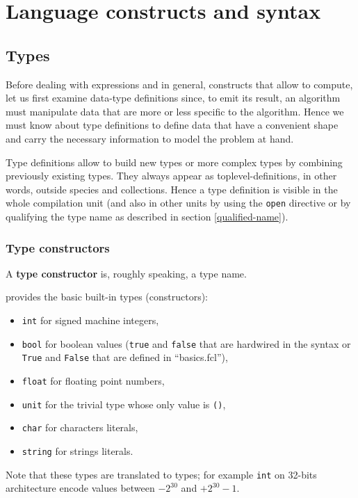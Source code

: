 

\section{Language constructs and syntax}
\subsection{Types}
Before dealing with expressions and in general, constructs that allow to
compute, let us first examine data-type definitions since, to emit its
result, an algorithm must manipulate data that are more or less specific to
the algorithm. Hence we must know about type definitions to define data that
have a convenient shape and carry the necessary information to model the
problem at hand.

Type definitions allow to build new types or more complex types by
combining previously existing types. They always appear as
toplevel-definitions, in other words, outside species and
collections. Hence a type definition is visible in the whole
compilation unit (and also in other units by using the {\tt open}
directive or by qualifying the type name as described in section
\ref{qualified-name}).

\subsubsection{Type constructors}
A {\bf type constructor} is, roughly speaking, a type name.

{\focal} provides the basic built-in
types (constructors):
\begin{itemize}
  \item {\tt int} for signed machine integers,
  \item {\tt bool} for boolean values ({\tt true} and {\tt false} that
    are hardwired in the syntax or {\tt True} and {\tt False} that are
    defined in ``basics.fcl''),
  \item {\tt float} for floating point numbers,
  \item {\tt unit} for the trivial type whose only value is {\tt ()},
  \item {\tt char} for characters literals,
  \item {\tt string} for strings literals.
\end{itemize}
Note that these types are translated to {\ocaml} types; for example
{\tt int} on 32-bits architecture encode values between $-2^{30}$
and $+2^{30}-1$.

